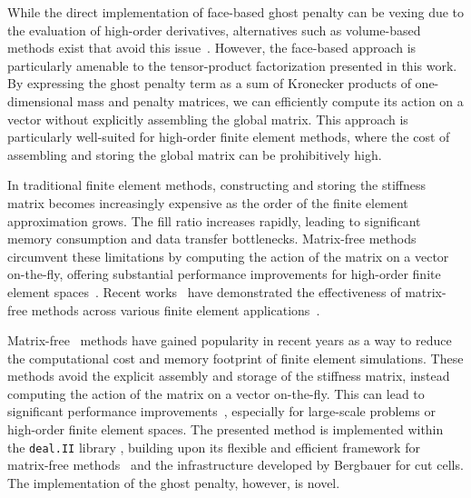 \documentclass[11pt,a4paper]{article}
\begin{document}
While the direct implementation of face-based ghost penalty can be vexing due to the evaluation of high-order
derivatives, alternatives such as volume-based methods exist that avoid this issue~\cite{burman2010ghost,
    preuss2018higher, bergbauer2024high}. However, the face-based approach is particularly amenable to the tensor-product
factorization presented in this work. By expressing the ghost penalty term as a sum of Kronecker products of
one-dimensional mass and penalty matrices, we can efficiently compute its action on a vector without explicitly
assembling the global matrix. This approach is particularly well-suited for high-order finite element methods, where
the cost of assembling and storing the global matrix can be prohibitively high.

In traditional finite element methods, constructing and storing the stiffness matrix becomes increasingly expensive as
the order of the finite element approximation grows. The fill ratio increases rapidly, leading to significant memory
consumption and data transfer bottlenecks. Matrix-free methods circumvent these limitations by computing the action of
the matrix on a vector on-the-fly, offering substantial performance improvements for high-order finite element
spaces~\cite{kolev2021efficient, kronbichler2012generic, kronbichler2019multigrid, bergbauer2024high}. Recent
works~\cite{davydov2020algorithms, davydov2020matrix, moxey2020efficient, clevenger2020flexible} have demonstrated the
effectiveness of matrix-free methods across various finite element applications~\cite{wichrowski2025finteStrain,
    wichrowski2023exploiting}.

Matrix-free~\cite{kronbichler2012generic} methods have gained popularity in recent years as a way to reduce the
computational cost and memory footprint of finite element simulations. These methods avoid the explicit assembly and
storage of the stiffness matrix, instead computing the action of the matrix on a vector on-the-fly. This can lead to
significant performance improvements~\cite{fischer2020scalability,kronbichler2019fast, kronbichler2019multigrid},
especially for large-scale problems or high-order finite element spaces. The presented method is implemented within the
\texttt{deal.II} library \cite{dealii2019design}, building upon its flexible and efficient framework for matrix-free
methods~\cite{kronbichler2012generic, kronbichler2019multigrid} and the infrastructure developed by Bergbauer
\cite{bergbauer2024high} for cut cells. The implementation of the ghost penalty, however, is novel.
\end{document}

